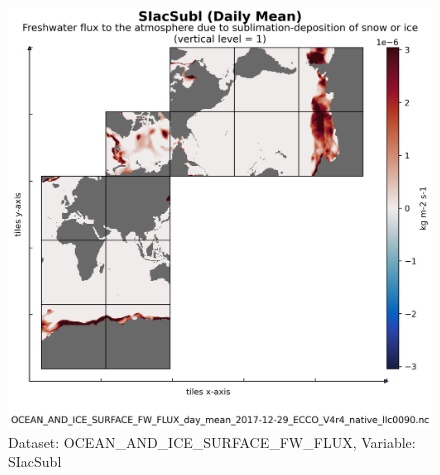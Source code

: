 \begin{figure}[H]
\centering
\includegraphics[scale=0.55]{../images/plots/native_plots/Ocean_and_Sea-Ice_Surface_Freshwater_Fluxes/SIacSubl.png}
\caption{Dataset: OCEAN\_AND\_ICE\_SURFACE\_FW\_FLUX, Variable: SIacSubl}
\label{tab:table-OCEAN_AND_ICE_SURFACE_FW_FLUX_SIacSubl-Plot}
\end{figure}
\newpage
\pagebreak
